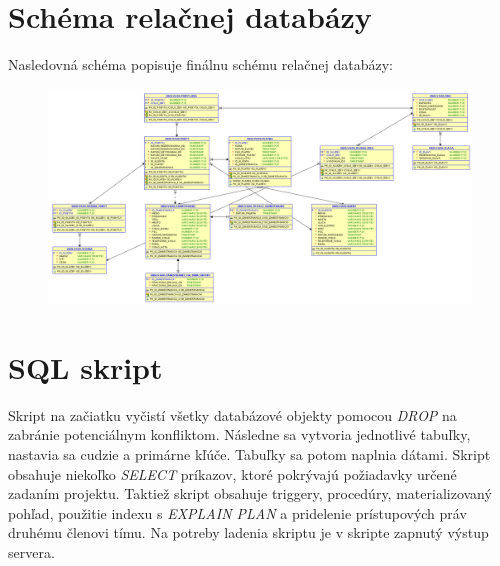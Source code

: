 \documentclass[a4paper,11pt,titlepage]{article}[11.3.2016]
\begin{document}
\section{Schéma relačnej databázy}
Nasledovná schéma popisuje finálnu schému relačnej databázy:

\begin{figure}
    \includegraphics[scale=0.4]{finaldb.png}
\end{figure}

\newpage

\section{SQL skript}
Skript na začiatku vyčistí všetky databázové objekty pomocou \textit{DROP} na zabránie potenciálnym konfliktom. Následne sa vytvoria jednotlivé tabuľky, nastavia sa cudzie a primárne kľúče. Tabuľky sa potom naplnia dátami. Skript obsahuje niekoľko \textit{SELECT} príkazov, ktoré pokrývajú požiadavky určené zadaním projektu. Taktiež skript obsahuje triggery, procedúry, materializovaný pohľad, použitie indexu s \textit{EXPLAIN PLAN} a pridelenie prístupových práv druhému členovi tímu. Na potreby ladenia skriptu je v skripte zapnutý výstup servera.
\end{document}
